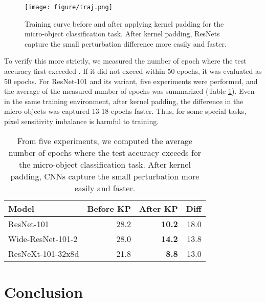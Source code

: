 \documentclass[letterpaper]{article} \usepackage{aaai22}  \usepackage{times}  \usepackage{helvet}  \usepackage{courier}  \usepackage[hyphens]{url}  \usepackage{graphicx} \urlstyle{rm} \def\UrlFont{\rm}  \usepackage{natbib}  \usepackage{caption} \DeclareCaptionStyle{ruled}{labelfont=normalfont,labelsep=colon,strut=off} \frenchspacing  \setlength{\pdfpagewidth}{8.5in}  \setlength{\pdfpageheight}{11in}  \usepackage{algorithm}
\begin{document}
\begin{figure}[t]
	\centering
	\texttt{[image: figure/traj.png]}
	\caption{Training curve before and after applying kernel padding for the micro-object classification task. After kernel padding, ResNets capture the small perturbation difference more easily and faster.}
	\label{fig:traj}
\end{figure}

To verify this more strictly, we measured the number of epoch where the test accuracy first exceeded . If it did not exceed  within 50 epochs, it was evaluated as 50 epochs. For ResNet-101 and its variant, five experiments were performed, and the average of the measured number of epochs was summarized (Table \ref{tab:epoch}). Even in the same training environment, after kernel padding, the difference in the micro-objects was captured 13-18 epochs faster. Thus, for some special tasks, pixel sensitivity imbalance is harmful to training.

\begin{table}[t!]
	\centering
\begin{tabular}{l|r|r|r}
		\toprule
		\textbf{Model}    & \textbf{Before KP} & \textbf{After KP} & \textbf{Diff} \\
		\midrule
        ResNet-101        & 28.2               & \textbf{10.2}              & 18.0         \\
        Wide-ResNet-101-2 & 28.0               & \textbf{14.2}              & 13.8         \\
        ResNeXt-101-32x8d & 21.8               & \textbf{8.8}               & 13.0         \\
		\bottomrule
	\end{tabular}
	\caption{From five experiments, we computed the average number of epochs where the test accuracy exceeds  for the micro-object classification task. After kernel padding, CNNs capture the small perturbation more easily and faster.}
	\label{tab:epoch}
\end{table}

\section{Conclusion}
\label{sec:Conclusion}
\end{document}
